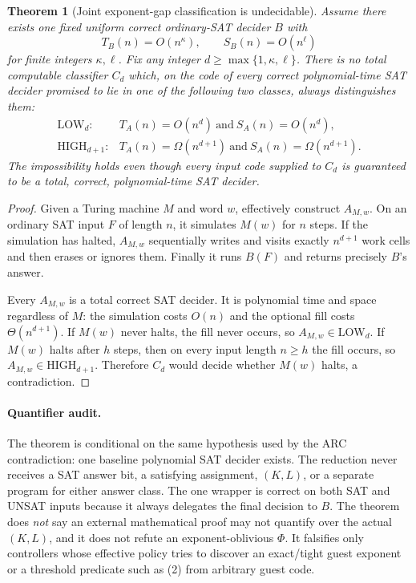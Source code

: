 \documentclass[11pt]{article}
\newtheorem{theorem}{Theorem}
\begin{document}
\begin{theorem}[Joint exponent-gap classification is undecidable]
Assume there exists one fixed uniform correct ordinary-SAT decider $B$ with
\[
 T_B(n)=O(n^\kappa),\qquad S_B(n)=O(n^\ell)
\]
for finite integers $\kappa,\ell$. Fix any integer $d\ge\max\{1,\kappa,\ell\}$. There is no total computable classifier $C_d$ which, on the code of every correct polynomial-time SAT decider promised to lie in one of the following two classes, always distinguishes them:
\[
\begin{array}{ll}
\mathrm{LOW}_d:&T_A(n)=O(n^d)\ \text{and}\ S_A(n)=O(n^d),\\
\mathrm{HIGH}_{d+1}:&T_A(n)=\Omega(n^{d+1})\ \text{and}\ S_A(n)=\Omega(n^{d+1}).
\end{array}
\tag{2}
\]
The impossibility holds even though every input code supplied to $C_d$ is guaranteed to be a total, correct, polynomial-time SAT decider.
\end{theorem}
\begin{proof}
Given a Turing machine $M$ and word $w$, effectively construct $A_{M,w}$. On an ordinary SAT input $F$ of length $n$, it simulates $M(w)$ for $n$ steps. If the simulation has halted, $A_{M,w}$ sequentially writes and visits exactly $n^{d+1}$ work cells and then erases or ignores them. Finally it runs $B(F)$ and returns precisely $B$'s answer.

Every $A_{M,w}$ is a total correct SAT decider. It is polynomial time and space regardless of $M$: the simulation costs $O(n)$ and the optional fill costs $\Theta(n^{d+1})$. If $M(w)$ never halts, the fill never occurs, so $A_{M,w}\in\mathrm{LOW}_d$. If $M(w)$ halts after $h$ steps, then on every input length $n\ge h$ the fill occurs, so $A_{M,w}\in\mathrm{HIGH}_{d+1}$. Therefore $C_d$ would decide whether $M(w)$ halts, a contradiction.
\end{proof}

\paragraph{Quantifier audit.}
The theorem is conditional on the same hypothesis used by the ARC contradiction: one baseline polynomial SAT decider exists. The reduction never receives a SAT answer bit, a satisfying assignment, $(K,L)$, or a separate program for either answer class. The one wrapper is correct on both SAT and UNSAT inputs because it always delegates the final decision to $B$. The theorem does \emph{not} say an external mathematical proof may not quantify over the actual $(K,L)$, and it does not refute an exponent-oblivious $\Phi$. It falsifies only controllers whose effective policy tries to discover an exact/tight guest exponent or a threshold predicate such as (2) from arbitrary guest code.
\end{document}
